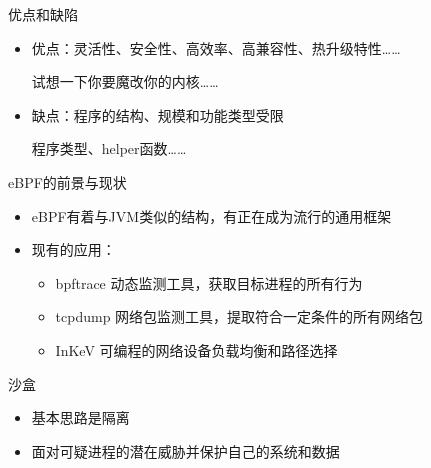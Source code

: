\documentclass[UTF8,aspectratio=169,fontset=macnew,xcolor=table]{ctexbeamer}
\begin{document}
\begin{frame}{优点和缺陷}

    \begin{itemize}
        \item 优点：灵活性、安全性、高效率、高兼容性、热升级特性……
        
        试想一下你要魔改你的内核……
    
        \item 缺点：程序的结构、规模和功能类型受限
        
        程序类型、helper函数……
    \end{itemize}
    
\end{frame}

\begin{frame}{eBPF的前景与现状}
    \begin{itemize}
        \item eBPF有着与JVM类似的结构，有正在成为流行的通用框架

        \item 现有的应用：
        \begin{itemize}
            \item bpftrace	动态监测工具，获取目标进程的所有行为
            \item tcpdump	网络包监测工具，提取符合一定条件的所有网络包
            \item InKeV	可编程的网络设备负载均衡和路径选择
        \end{itemize}
    \end{itemize}
\end{frame}

\begin{frame}{沙盒}
    \begin{itemize}
        \item 基本思路是隔离

        \item 面对可疑进程的潜在威胁并保护自己的系统和数据
    \end{itemize}
\end{frame}
\end{document}
